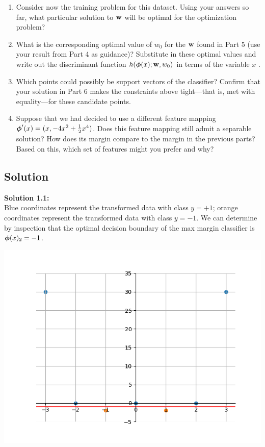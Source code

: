 \documentclass[submit]{harvardml}
\begin{document}
\begin{problem}
\begin{enumerate}
\item Consider now the training problem for this dataset. Using your
  answers so far, what particular solution to $\mathbf{w}$ will be optimal
  for the optimization problem?

\item What is the corresponding optimal value of $w_0$ for the
  $\mathbf{w}$ found in Part 5 (use your result from Part 4 as guidance)?
  Substitute in these optimal values and write out the discriminant
  function $h(\boldsymbol{\phi}(x);\mathbf{w},w_0)$ in terms of the variable $x$ .


\item Which points could possibly be support vectors of the classifier?  Confirm that
  your solution in Part 6 makes the constraints above tight---that is,
  met with equality---for these candidate points.

\item Suppose that we had decided to use a different feature mapping
    $\boldsymbol{\phi}'(x) = (x, -4x^2 + \frac{1}{2}x^4 )$.  Does
    this feature mapping still admit a separable solution?  How does
    its margin compare to the margin in the previous parts?  Based on
    this, which set of features might you prefer and why? 
    
\end{enumerate}

\end{problem}

\subsection*{Solution}
\noindent\textbf{Solution 1.1:}\\
Blue coordinates represent the transformed data with class $y = +1$; orange coordinates represent the transformed data with class $y = -1$. We can determine by inspection that the optimal decision boundary of the max margin classifier is $\boldsymbol{\phi}(x)_2 = -1$.
\begin{center}
    \includegraphics[scale=0.6]{1.1.png}
\end{center}
\end{document}

